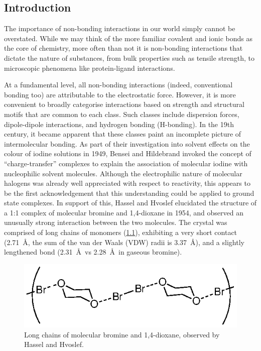 \begin{refsection}
\chapter{Introduction}\label{ch:intro}

The importance of non-bonding interactions in our world simply cannot be overstated.
While we may think of the more familiar covalent and ionic bonds as the core of chemistry, more often than not it is non-bonding interactions that dictate the nature of substances, from bulk properties such as tensile strength, to microscopic phenomena like protein-ligand interactions.

At a fundamental level, all non-bonding interactions (indeed, conventional bonding too) are attributable to the electrostatic force.
However, it is more convenient to broadly categorise interactions based on strength and structural motifs that are common to each class.
Such classes include dispersion forces, dipole-dipole interactions, and hydrogen bonding (H-bonding).
In the 19th century, it became apparent that these classes paint an incomplete picture of intermolecular bonding.
As part of their investigation into solvent effects on the colour of iodine solutions in 1949, Bensei and Hildebrand invoked the concept of ``charge-transfer'' complexes to explain the association of molecular iodine with nucleophilic solvent molecules.\autocite{Benesi1949}
Although the electrophilic nature of molecular halogens was already well appreciated with respect to reactivity, this appears to be the first acknowledgement that this understanding could be applied to ground state complexes.
In support of this, Hassel and Hvoslef elucidated the structure of a 1:1 complex of molecular bromine and 1,4-dioxane in 1954, and observed an unusually strong interaction between the two molecules.\autocite{Hassel1954}
The crystal was comprised of long chains of monomers (\cref{fig:hassel-xray}), exhibiting a very short  contact (2.71~\AA, the sum of the van der Waals (VDW) radii is 3.37~\AA), and a slightly lengthened  bond (2.31~\AA\ vs 2.28~\AA\ in gaseous bromine).

\begin{figure}[ht]
  \includegraphics[width=0.6\columnwidth]{Figures/hassel-xray.eps}
  \caption[Bromine-dioxane complex.]{Long chains of molecular bromine and 1,4-dioxane, observed by Hassel and Hvoslef.}\label{fig:hassel-xray}
\end{figure}


\end{refsection}
